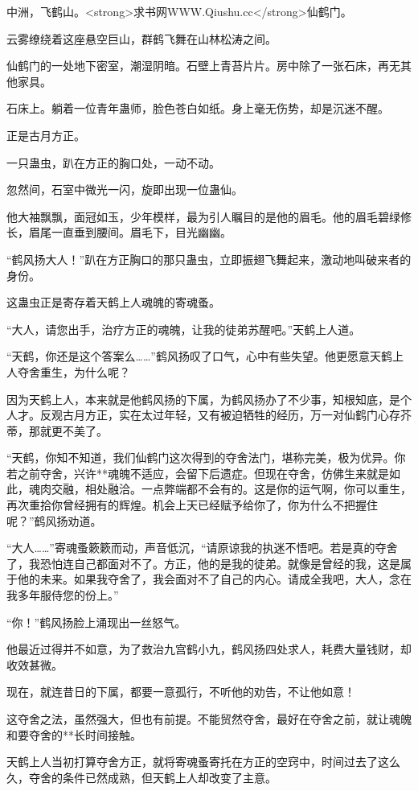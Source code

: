 \begin{this_body}
中洲，飞鹤山。<strong>求书网WWW.Qiushu.cc</strong>仙鹤门。

云雾缭绕着这座悬空巨山，群鹤飞舞在山林松涛之间。

仙鹤门的一处地下密室，潮湿阴暗。石壁上青苔片片。房中除了一张石床，再无其他家具。

石床上。躺着一位青年蛊师，脸色苍白如纸。身上毫无伤势，却是沉迷不醒。

正是古月方正。

一只蛊虫，趴在方正的胸口处，一动不动。

忽然间，石室中微光一闪，旋即出现一位蛊仙。

他大袖飘飘，面冠如玉，少年模样，最为引人瞩目的是他的眉毛。他的眉毛碧绿修长，眉尾一直垂到腰间。眉毛下，目光幽幽。

“鹤风扬大人！”趴在方正胸口的那只蛊虫，立即振翅飞舞起来，激动地叫破来者的身份。

这蛊虫正是寄存着天鹤上人魂魄的寄魂蚤。

“大人，请您出手，治疗方正的魂魄，让我的徒弟苏醒吧。”天鹤上人道。

“天鹤，你还是这个答案么……”鹤风扬叹了口气，心中有些失望。他更愿意天鹤上人夺舍重生，为什么呢？

因为天鹤上人，本来就是他鹤风扬的下属，为鹤风扬办了不少事，知根知底，是个人才。反观古月方正，实在太过年轻，又有被迫牺牲的经历，万一对仙鹤门心存芥蒂，那就更不美了。

“天鹤，你知不知道，我们仙鹤门这次得到的夺舍法门，堪称完美，极为优异。你若之前夺舍，兴许**魂魄不适应，会留下后遗症。但现在夺舍，仿佛生来就是如此，魂肉交融，相处融洽。一点弊端都不会有的。这是你的运气啊，你可以重生，再次重拾你曾经拥有的辉煌。机会上天已经赋予给你了，你为什么不把握住呢？”鹤风扬劝道。

“大人……”寄魂蚤簌簌而动，声音低沉，“请原谅我的执迷不悟吧。若是真的夺舍了，我恐怕连自己都面对不了。方正，他的是我的徒弟。就像是曾经的我，这是属于他的未来。如果我夺舍了，我会面对不了自己的内心。请成全我吧，大人，念在我多年服侍您的份上。”

“你！”鹤风扬脸上涌现出一丝怒气。

他最近过得并不如意，为了救治九宫鹤小九，鹤风扬四处求人，耗费大量钱财，却收效甚微。

现在，就连昔日的下属，都要一意孤行，不听他的劝告，不让他如意！

这夺舍之法，虽然强大，但也有前提。不能贸然夺舍，最好在夺舍之前，就让魂魄和要夺舍的**长时间接触。

天鹤上人当初打算夺舍方正，就将寄魂蚤寄托在方正的空窍中，时间过去了这么久，夺舍的条件已然成熟，但天鹤上人却改变了主意。


\end{this_body}
